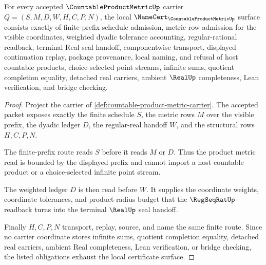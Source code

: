 \begin{theorem}
\label{thm:countable-product-metric-namecert-surface}
For every accepted $\CountableProductMetricUp$ carrier $Q=(S,M,D,W,H,C,P,N)$, the local $\NameCert_{\CountableProductMetricUp}$ surface consists exactly of finite-prefix schedule admission, metric-row admission for the visible coordinates, weighted dyadic tolerance accounting, regular-rational readback, terminal Real seal handoff, componentwise transport, displayed continuation replay, package provenance, local naming, and refusal of host countable products, choice-selected point streams, infinite sums, quotient completion equality, detached real carriers, ambient $\RealUp$ completeness, Lean verification, and bridge checking.
\end{theorem}
\begin{proof}
Project the carrier of \autoref{def:countable-product-metric-carrier}. The accepted packet exposes exactly the finite schedule $S$, the metric rows $M$ over the visible prefix, the dyadic ledger $D$, the regular-real handoff $W$, and the structural rows $H,C,P,N$.

The finite-prefix route reads $S$ before it reads $M$ or $D$. Thus the product metric read is bounded by the displayed prefix and cannot import a host countable product or a choice-selected infinite point stream.

The weighted ledger $D$ is then read before $W$. It supplies the coordinate weights, coordinate tolerances, and product-radius budget that the $\RegSeqRatUp$ readback turns into the terminal $\RealUp$ seal handoff.

Finally $H,C,P,N$ transport, replay, source, and name the same finite route. Since no carrier coordinate stores infinite sums, quotient completion equality, detached real carriers, ambient Real completeness, Lean verification, or bridge checking, the listed obligations exhaust the local certificate surface.
\end{proof}

